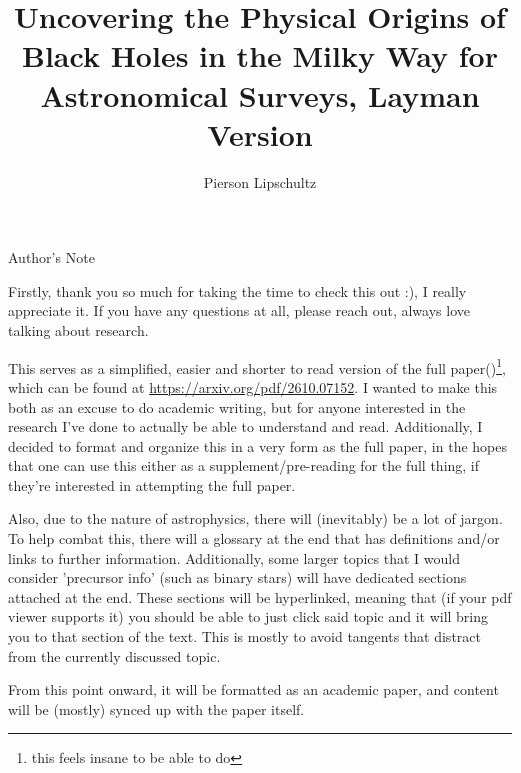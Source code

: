 \documentclass[amsmath,twocolumn]{aastex702}
\begin{document}
\onecolumngrid
\thispagestyle{empty}
\begin{center}
{\large Author's Note}
\end{center}

\vspace{1em}

Firstly, thank you so much for taking the time to check this out :), I really appreciate it. If you have any questions at all, please reach out, always love talking about research.

This serves as a simplified, easier and shorter to read version of the full paper(\cite{kiato2026uncoveringphysicaloriginsblack})\footnote{this feels insane to be able to do}, which can be found at \url{https://arxiv.org/pdf/2610.07152}. I wanted to make this both as an excuse to do academic writing, but for anyone interested in the research I've done to actually be able to understand and read. Additionally, I decided to format and organize this in a very form as the full paper, in the hopes that one can use this either as a supplement/pre-reading for the full thing, if they're interested in attempting the full paper.

Also, due to the nature of astrophysics, there will (inevitably) be a lot of jargon. To help combat this, there will a glossary at the end that has definitions and/or links to further information. Additionally, some larger topics that I would consider 'precursor info' (such as binary stars) will have dedicated sections attached at the end. These sections will be hyperlinked, meaning that (if your pdf viewer supports it) you should be able to just click said topic and it will bring you to that section of the text. This is mostly to avoid tangents that distract from the currently discussed topic.

From this point onward, it will be formatted as an academic paper, and content will be (mostly) synced up with the paper itself.

\clearpage

\title{Uncovering the Physical Origins of Black Holes in the Milky Way for Astronomical Surveys, \textbf{Layman Version}}

\author[orcid=0009-0007-5979-7930,sname='North America']{Pierson Lipschultz}
\end{document}
